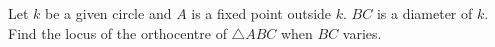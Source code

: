 Let $k$ be a given circle and $A$ is a fixed point outside $k$. $BC$ is a diameter of $k$. Find the locus of the orthocentre of $\triangle ABC$ when $BC$ varies.

